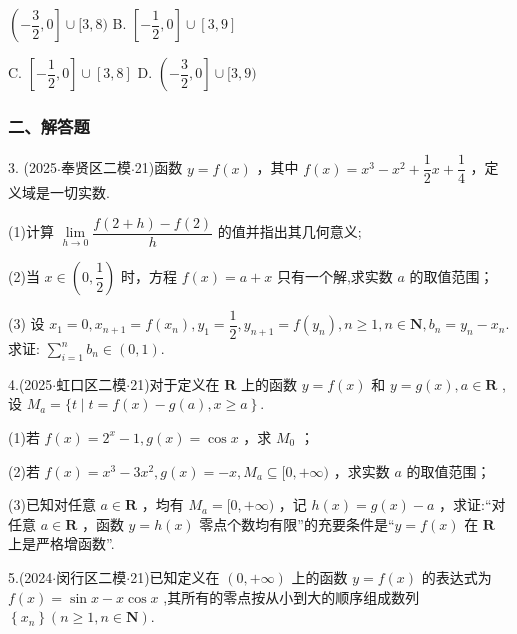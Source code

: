 \xx{}{}{}{}$\left( {-\dfrac{3}{2},0}\right\rbrack   \cup  \lbrack 3,8)$ B. $\left\lbrack  {-\dfrac{1}{2},0}\right\rbrack   \cup  \left\lbrack  {3,9}\right\rbrack$

C. $\left\lbrack  {-\dfrac{1}{2},0}\right\rbrack   \cup  \left\lbrack  {3,8}\right\rbrack$ D. $\left( {-\dfrac{3}{2},0}\right\rbrack   \cup  \lbrack 3,9)$

\subsubsection*{二、解答题}

3. (2025$\cdot$奉贤区二模$\cdot$21)函数 $y = f\left( x\right)$ ，其中 $f\left( x\right)  = {x}^{3} - {x}^{2} + \dfrac{1}{2}x + \dfrac{1}{4}$ ，定义域是一切实数.

(1)计算 $\mathop{\lim }\limits_{{h \rightarrow  0}}\dfrac{f\left( {2 + h}\right)  - f\left( 2\right) }{h}$ 的值并指出其几何意义;

(2)当 $x \in  \left( {0,\dfrac{1}{2}}\right)$ 时，方程 $f\left( x\right)  = a + x$ 只有一个解,求实数 $a$ 的取值范围；

(3) 设 ${x}_{1} = 0,{x}_{n + 1} = f\left( {x}_{n}\right) ,{y}_{1} = \dfrac{1}{2},{y}_{n + 1} = f\left( {y}_{n}\right) ,n \geq  1,n \in  \mathbf{N},{b}_{n} = {y}_{n} - {x}_{n}$. 求证: $\mathop{\sum }\limits_{{i = 1}}^{n}{b}_{n} \in  \left( {0,1}\right)$.

4.(2025$\cdot$虹口区二模$\cdot$21)对于定义在 $\mathbf{R}$ 上的函数 $y = f\left( x\right)$ 和 $y = g\left( x\right) ,a \in  \mathbf{R}$ ,设 ${M}_{a} = \{ t \mid  t =  \left. {f\left( x\right)  - g\left( a\right) ,x \geq  a}\right\}$.

(1)若 $f\left( x\right)  = {2}^{x} - 1,g\left( x\right)  = \cos x$ ，求 ${M}_{0}$ ；

(2)若 $f\left( x\right)  = {x}^{3} - 3{x}^{2},g\left( x\right)  =  - x,{M}_{a} \subseteq  \lbrack 0, + \infty )$ ，求实数 $a$ 的取值范围；

(3)已知对任意 $a \in  \mathbf{R}$ ，均有 ${M}_{a} = \lbrack 0, + \infty )$ ，记 $h\left( x\right)  = g\left( x\right)  - a$ ，求证:“对任意 $a \in  \mathbf{R}$ ，函数 $y =  h\left( x\right)$ 零点个数均有限”的充要条件是“$y = f\left( x\right)$ 在 $\mathbf{R}$ 上是严格增函数”.

5.(2024$\cdot$闵行区二模$\cdot$21)已知定义在 $\left( {0, + \infty }\right)$ 上的函数 $y = f\left( x\right)$ 的表达式为 $f\left( x\right)  = \sin x -  x\cos x$ ,其所有的零点按从小到大的顺序组成数列 $\left\{  {x}_{n}\right\}  \left( {n \geq  1,n \in  \mathbf{N}}\right)$.

